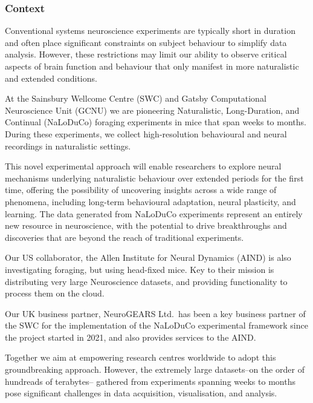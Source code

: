 \subsubsection{Context}

Conventional systems neuroscience experiments are typically short in duration
and often place significant constraints on subject behaviour to simplify data
analysis.
%
However, these restrictions may limit our ability to observe critical
aspects of brain function and behaviour that only manifest in more naturalistic
and extended conditions.

At the Sainsbury Wellcome Centre (SWC) and Gatsby Computational Neuroscience
Unit (GCNU) we are pioneering Naturalistic, Long-Duration, and Continual
(NaLoDuCo) foraging experiments in mice that span weeks to months. During these
experiments, we collect high-resolution behavioural and neural recordings in
naturalistic settings.
%

This novel experimental approach will enable researchers to explore neural
mechanisms underlying naturalistic behaviour over extended periods for the first
time, offering the possibility of uncovering insights across a wide range of
phenomena, including long-term behavioural adaptation, neural plasticity, and
learning.
%
The data generated from NaLoDuCo experiments represent an entirely new resource
in neuroscience, with the potential to drive breakthroughs and discoveries that
are beyond the reach of traditional experiments.

Our US collaborator, the Allen Institute for Neural Dynamics (AIND) is also investigating
foraging, but using head-fixed mice. Key to their mission is distributing very large Neuroscience datasets,
and providing functionality to process them on the cloud.

Our UK business partner, NeuroGEARS Ltd.\ has been a key business partner of the SWC for the
implementation of the NaLoDuCo experimental framework since the project started
in 2021, and also provides services to the AIND.

Together we aim at empowering research centres worldwide to adopt this groundbreaking
approach.
%
However, the extremely large datasets--on the order of hundreads of terabytes--
gathered from experiments spanning weeks to months pose significant
challenges in data acquisition, visualisation, and analysis.

